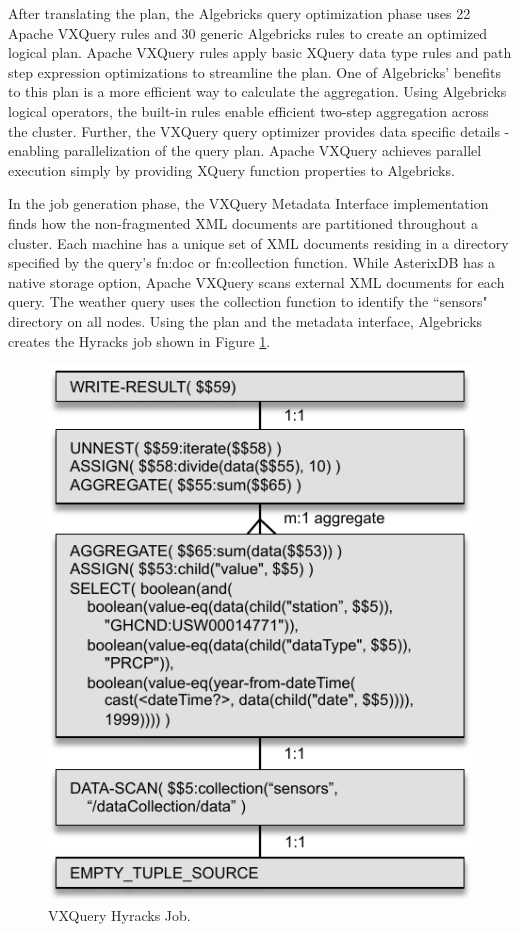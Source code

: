 After translating the plan, the Algebricks query optimization phase uses 22 Apache VXQuery rules and 30 generic Algebricks rules to create an optimized logical plan.
Apache VXQuery rules apply basic XQuery data type rules and path step expression optimizations to streamline the plan.
One of Algebricks' benefits to this plan is a more efficient way to calculate the aggregation.
Using Algebricks logical operators, the built-in rules enable efficient two-step aggregation across the cluster.
Further, the VXQuery query optimizer provides data specific details - enabling parallelization of the query plan.
Apache VXQuery achieves parallel execution simply by providing XQuery function properties to Algebricks. 

In the job generation phase, the VXQuery Metadata Interface implementation finds how the non-fragmented XML documents are partitioned throughout a cluster.
Each machine has a unique set of XML documents residing in a directory specified by the query's fn:doc or fn:collection function.
While AsterixDB has a native storage option, Apache VXQuery scans external XML documents for each query.
The weather query uses the collection function to identify the ``sensors" directory on all nodes.
Using the plan and the metadata interface, Algebricks creates the Hyracks job shown in Figure \ref{fig:vxquery_hyracks_job}.

\begin{figure}[tb]
\vspace{-.8ex}
\centering
\includegraphics[width=0.50\columnwidth]{images/vxquery_hyracks_job}
\vspace{-1ex}
\caption{VXQuery Hyracks Job.}
\vspace{-.8ex}
\label{fig:vxquery_hyracks_job}
\end{figure}


